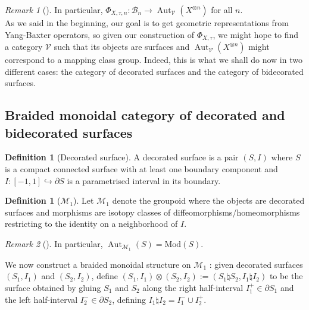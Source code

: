 \documentclass[reqno]{amsart}
\theoremstyle{definition}
\newtheorem{definition}[theorem]{Definition}
\theoremstyle{remark}
\newtheorem*{remark}{Remark}
\DeclareMathOperator{\Aut}{Aut}
\newcommand{\Mod}{{\mathrm{Mod}}}
\begin{document}
     \begin{remark}[]
         In particular,
         $\Phi_{X,\tau,n} \colon
         \mathcal{B}_n \to \Aut_{\mathcal{V}}
         \left( X^{\otimes n} \right) $ for all
         $n$.\\

         As we said in the beginning, our goal
         is to get geometric representations from
         Yang-Baxter operators, so given our construction
         of $\Phi_{X,\tau}$, we might hope to
         find a category $\mathcal{V}$ such that
         its objects are surfaces and
         $\Aut_{\mathcal{V}} \left( X^{\otimes n} \right) $ 
         might correspond to a mapping class group. Indeed,
         this is what we shall do now in two
         different cases: the category of decorated surfaces
         and the category of bidecorated surfaces.
     \end{remark}




   \subsection{Braided monoidal category of decorated and
   bidecorated surfaces}

   \begin{definition}[Decorated surface]
       A decorated surface is a pair
       $(S,I)$ where $S$ is a compact connected
       surface with at least one boundary component
       and $I \colon \left[ -1,1 \right] 
       \hookrightarrow \partial S$ is a parametrised interval
       in its boundary.
   \end{definition}

   \begin{definition}[$\mathcal{M}_1$]
       Let $\mathcal{M}_1$ denote the groupoid where
       the objects are
       decorated surfaces and
       morphisms are isotopy classes of diffeomorphisms/homeomorphisms
       restricting to the identity on a neighborhood
       of $I$.
   \end{definition}

   \begin{remark}[]
       In particular, $\Aut_{\mathcal{M}_1} 
       \left( S \right) = \Mod (S)$.
   \end{remark}

   We now construct a braided monoidal structure on
   $\mathcal{M}_1$ : given decorated surfaces
   $\left( S_1, I_1 \right) $ and
   $\left( S_2,I_2 \right) $, define
   $\left( S_1, I_1 \right) 
   \otimes \left( S_2, I_2 \right) 
   := \left( S_1 \natural S_2, I_1 \natural I_2 \right) $ to be
   the surface obtained by gluing
   $S_1$ and $S_2$ along the right half-interval
   $I_1^{+} \in \partial S_1$ and the
   left half-interval $I_2^{-} \in \partial S_2$, defining
   $I_1 \natural I_2 = I_1^{-} \cup I_2^{+}$.
\end{document}
